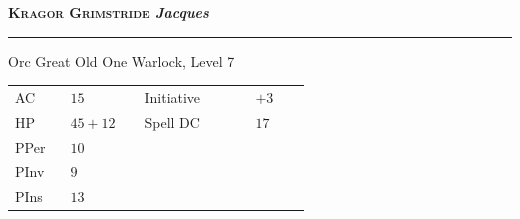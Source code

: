 \documentclass{article}
\newcommand{\h}[1]{\textcolor{headercolor}{#1}}
\begin{document}
\pagestyle{empty}
\vspace*{0.5\textheight}
\Large\textbf{\textcolor{headercolor}{\scshape Kragor Grimstride} \hfill \textit{Jacques}}

\rule{\linewidth}{0.4pt}

Orc Great Old One Warlock, Level 7

\vspace{1em}
\begin{tabular}{%
        >{\raggedleft\arraybackslash}p{0.15\linewidth} |%
        p{0.20\linewidth}%
        >{\raggedleft\arraybackslash}p{0.30\linewidth} |%
        p{0.15\linewidth}}%
\h{AC}   & $15$      & \h{Initiative} & $+3$ \\
\h{HP}   & $45 + 12$ & \h{Spell DC}   & $17$ \\
\h{PPer} & $10$      & & \\
\h{PInv} & $9$       & & \\
\h{PIns} & $13$      & &
\end{tabular}

\end{document}
